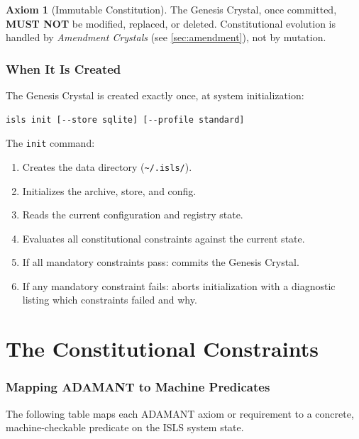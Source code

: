\documentclass[11pt,a4paper,twoside]{article}
\theoremstyle{definition}
\newtheorem{axiom}{Axiom}[section]
\theoremstyle{plain}
\theoremstyle{remark}
\newcommand{\ISLS}{\textsf{ISLS}}
\newcommand{\ADAMANT}{\textsf{ADAMANT}}
\begin{document}
\begin{axiom}[Immutable Constitution]\label{ax:immutable}
The Genesis Crystal, once committed, \textbf{MUST NOT} be modified,
replaced, or deleted. Constitutional evolution is handled by
\emph{Amendment Crystals} (see \cref{sec:amendment}), not by mutation.
\end{axiom}


\section{When It Is Created}\label{sec:when}

The Genesis Crystal is created exactly once, at system initialization:

\begin{lstlisting}
isls init [--store sqlite] [--profile standard]
\end{lstlisting}

The \texttt{init} command:
\begin{enumerate}[nosep]
  \item Creates the data directory (\texttt{\~{}/.isls/}).
  \item Initializes the archive, store, and config.
  \item Reads the current configuration and registry state.
  \item Evaluates all constitutional constraints against the current state.
  \item If all mandatory constraints pass: commits the Genesis Crystal.
  \item If any mandatory constraint fails: aborts initialization with
        a diagnostic listing which constraints failed and why.
\end{enumerate}


\part{The Constitutional Constraints}\label{part:constraints}

\section{Mapping \ADAMANT{} to Machine Predicates}\label{sec:mapping}

The following table maps each \ADAMANT{} axiom or requirement to a
concrete, machine-checkable predicate on the \ISLS{} system state.
\end{document}
